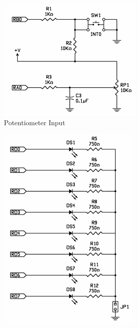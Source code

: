 \documentclass[11pt]{article}
\begin{document}
\begin{figure}
\centering
	\begin{subfigure}[b]{.3\textwidth}
		\centering
		\includegraphics[width=\textwidth]{Figures/demo-board-pot-pushbutton-circuit.pdf}
		\caption[]%
		{{\small Potentiometer Input}}
	\end{subfigure}
	\quad
	\begin{subfigure}[b]{0.3\textwidth}
		\centering
		\includegraphics[width=\textwidth]{Figures/demo-board-led-circuit.pdf}

\end{subfigure}
\end{figure}
\end{document}
